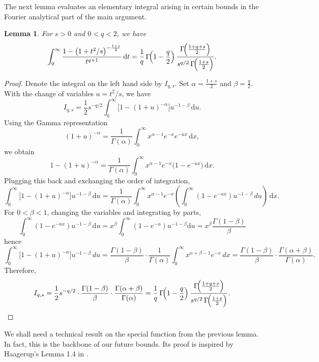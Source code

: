 \documentclass[10pt]{article}
\newcommand{\dd}{\mathrm{d}}
\newcommand{\1}{\textbf{1}}
\newtheorem{lemma}[theorem]{Lemma}
\theoremstyle{remark}
\theoremstyle{definition}
\begin{document}
The next lemma evaluates an elementary integral arising in certain bounds in the Fourier analytical part of the main argument.



\begin{lemma}\label{lm:integral} For $s>0$ and $0<q<2$, we have
\[
\int_{0}^{\infty}\frac{1-\bigl(1+t^{2}/s\bigr)^{-\frac{1+s}{2}}}{t^{q+1}}\,\dd t =\frac{1}{q}\,\Gamma\!\Bigl(1-\frac q2\Bigr)\,
		\frac{\Gamma\!\Bigl(\frac{1+q+s}{2}\Bigr)}{s^{q/2}\,\Gamma\!\Bigl(\frac{1+s}{2}\Bigr)}.
\]
\end{lemma}

\begin{proof}
Denote the integral on the left hand side by $I_{q,s}$.
Set $\alpha=\frac{1+s}{2}$ and $\beta=\frac q2$.
With the change of variables $u=t^{2}/s$, we have 
\[
		I_{q,s}
		=\frac12 s^{-q/2}\int_{0}^{\infty}\bigl[1-(1+u)^{-\alpha}\bigr]u^{-1-\beta}\,\dd u.
\]
Using the Gamma representation
\[
		(1+u)^{-\alpha}=\frac{1}{\Gamma(\alpha)}\int_{0}^{\infty}x^{\alpha-1}e^{-x}e^{-ux}\,\dd x,
\]
we obtain
\[
		1-(1+u)^{-\alpha}
		=\frac{1}{\Gamma(\alpha)}\int_{0}^{\infty}x^{\alpha-1}e^{-x}\bigl(1-e^{-ux}\bigr)\,\dd x.
\]
Plugging this back and exchanging the order of integration,
\[
		\int_{0}^{\infty}\bigl[1-(1+u)^{-\alpha}\bigr]u^{-1-\beta}\,\dd u
		=\frac{1}{\Gamma(\alpha)}\int_{0}^{\infty}x^{\alpha-1}e^{-x}
		\left(\int_{0}^{\infty}(1-e^{-ux})u^{-1-\beta}\,du\right)\,\dd x.
\]
For $0<\beta<1$, changing the variables and integrating by parts,
\[
		\int_{0}^{\infty}(1-e^{-ux})u^{-1-\beta}\,\dd u = x^\beta\int_0^\infty (1-e^{-u})u^{-1-\beta}\dd u 
		=x^{\beta}\frac{\Gamma(1-\beta)}{\beta}
\]
hence
\[
		\int_{0}^{\infty}\bigl[1-(1+u)^{-\alpha}\bigr]u^{-1-\beta}\,du
		=\frac{\Gamma(1-\beta)}{\beta}\cdot \frac{1}{\Gamma(\alpha)}
		\int_{0}^{\infty}x^{\alpha+\beta-1}e^{-x}\,dx
		=\frac{\Gamma(1-\beta)}{\beta}\cdot\frac{\Gamma(\alpha+\beta)}{\Gamma(\alpha)}.
\]
Therefore,
\[
		I_{q,s}
		=\frac12 s^{-q/2}\cdot \frac{\Gamma(1-\beta)}{\beta}\cdot\frac{\Gamma(\alpha+\beta)}{\Gamma(\alpha)}
		=\frac{1}{q}\,\Gamma\!\Bigl(1-\frac q2\Bigr)\,
		\frac{\Gamma\!\Bigl(\frac{1+q+s}{2}\Bigr)}{s^{q/2}\,\Gamma\!\Bigl(\frac{1+s}{2}\Bigr)}.\qedhere
\]
\end{proof}


We shall need a technical result on the special function from the previous lemma. In fact, this is the backbone of our future bounds. Its proof is inspired by Haagerup's Lemma 1.4 in \cite{Haa}.
\end{document}
